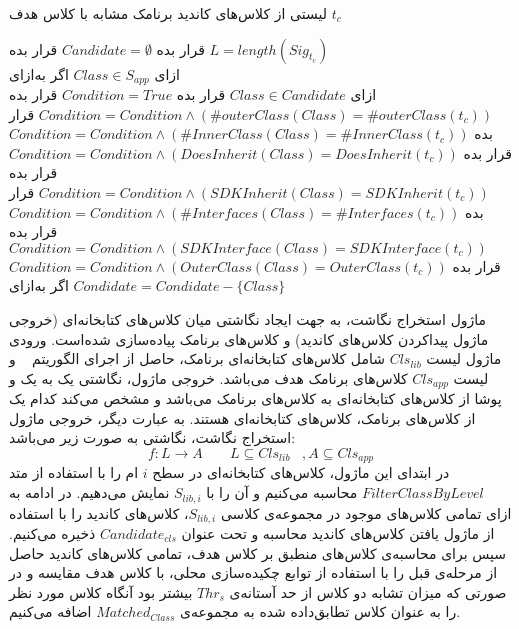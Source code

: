  لیستی از کلاس‌های کاندید برنامک مشابه با کلاس هدف $t_c$

 قرار بده $Candidate = \emptyset$ 
 قرار بده $L= length(Sig_{t_c})$  \\
‌ازای $Class \in S_{app}$ 
‌اگر
‌به‌ازای\\
‌ازای $Class \in Candidate$ 
 قرار بده $Condition = True$
 قرار بده $Condition= Condition \wedge (\#outerClass(Class) = \#outerClass(t_c))$
 قرار بده $Condition= Condition \wedge (\#InnerClass(Class) = \#InnerClass(t_c))$
 قرار بده $Condition= Condition \wedge (DoesInherit(Class) = DoesInherit(t_c))$
 قرار بده $Condition= Condition \wedge (SDKInherit(Class) = SDKInherit(t_c))$
 قرار بده $Condition= Condition \wedge (\#Interfaces(Class) = \#Interfaces(t_c))$
 قرار بده $Condition= Condition \wedge (SDKInterface(Class) = SDKInterface(t_c))$
 قرار بده $Condition= Condition \wedge (OuterClass(Class) = OuterClass(t_c))$
$Condidate=Condidate - \{Class\}$
‌اگر
‌به‌ازای

ماژول استخراج نگاشت، به جهت ایجاد نگاشتی میان کلاس‌های کتابخانه‌ای (خروجی ماژول پیداکردن کلاس‌های کاندید)‌ و کلاس‌های برنامک پیاده‌سازی شده‌است. ورودی ماژول لیست $Cls_{lib}$  شامل کلاس‌های کتابخانه‌ای برنامک، حاصل از اجرای الگوریتم ~ و لیست $Cls_{app}$ کلاس‌های برنامک هدف می‌باشد. خروجی ماژول، نگاشتی یک به یک و پوشا از کلاس‌های کتابخانه‌ای به کلاس‌های برنامک می‌باشد و مشخص می‌کند کدام یک از کلاس‌های برنامک، کلاس‌های کتابخانه‌ای هستند. به عبارت دیگر، خروجی ماژول استخراج نگاشت، نگاشتی به صورت زیر می‌باشد:
  \begin{equation}
  	f: L \rightarrow A  \;\;\;\;\;\;\; L\subseteq Cls_{lib}  \;\;\; , A \subseteq Cls_{app}
  \end{equation}
در ابتدای این ماژول، کلاس‌های کتابخانه‌ای در سطح $i$ ام را با استفاده از متد $FilterClassByLevel$ محاسبه می‌کنیم و آن‌ را با $S_{lib,i}$ نمایش می‌دهیم. در ادامه به ازای تمامی کلاس‌های موجود در مجموعه‌ی کلاسی $S_{lib,i}$، کلاس‌های کاندید را با استفاده از ماژول یافتن کلاس‌های کاندید محاسبه و تحت عنوان $Candidate_{cls}$ ذخیره می‌کنیم.  سپس برای محاسبه‌ی کلاس‌های منطبق بر کلاس هدف، تمامی کلاس‌های کاندید حاصل از مرحله‌ی قبل را با استفاده از توابع چکیده‌سازی محلی، با کلاس هدف مقایسه و در صورتی که میزان تشابه دو کلاس از حد آستانه‌ی $Thr_{s}$ بیشتر بود آنگاه کلاس مورد نظر را به عنوان کلاس تطابق‌داده شده به مجموعه‌ی $Matched_{Class}$ اضافه می‌کنیم.  



